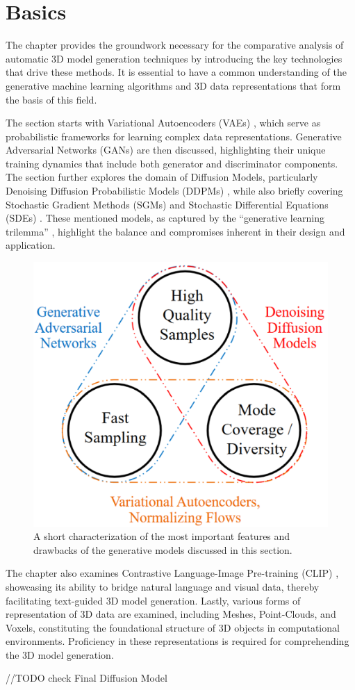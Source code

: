 \chapter{Basics}\label{ch:basics}

The chapter provides the groundwork necessary for the comparative analysis of automatic 3D model generation techniques by introducing the key technologies that drive these methods. It is essential to have a common understanding of the generative machine learning algorithms and 3D data representations that form the basis of this field.

The section starts with Variational Autoencoders (VAEs) \citep{kingmaVAE,rezendeVAE}, which serve as probabilistic frameworks for learning complex data representations. Generative Adversarial Networks (GANs) \citep{goodfellowGAN} are then discussed, highlighting their unique training dynamics that include both generator and discriminator components. The section further explores the domain of Diffusion Models, particularly Denoising Diffusion Probabilistic Models (DDPMs) \citep{hoDDPMs,sohlDDPM}, while also briefly covering Stochastic Gradient Methods (SGMs) \citep{song2019SGM} and Stochastic Differential Equations (SDEs) \citep{song2020score,song2021maximum}. These mentioned models, as captured by the ``generative learning trilemma'' \citep{xiao2022tackling}, highlight the balance and compromises inherent in their design and application.

\begin{figure}[ht]
    \centering
      \includegraphics[width=.4\columnwidth]{figures/BasicTrilemma.png}
      \caption{A short characterization of the most important features and drawbacks of the generative models discussed in this section.~\citep{xiao2022tackling}}\label{fig:generativeTrilemma}
\end{figure}

The chapter also examines Contrastive Language-Image Pre-training (CLIP) \citep{radfordCLIP}, showcasing its ability to bridge natural language and visual data, thereby facilitating text-guided 3D model generation. Lastly, various forms of representation of 3D data are examined, including Meshes, Point-Clouds, and Voxels, constituting the foundational structure of 3D objects in computational environments. Proficiency in these representations is required for comprehending the 3D model generation.

//TODO check Final Diffusion Model






